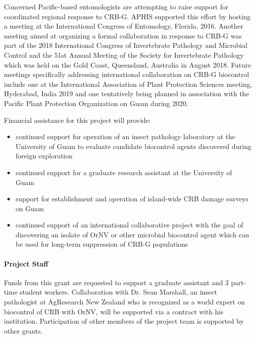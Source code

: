 \documentclass[14pt,english,letterpaper]{scrartcl}
\begin{document}
Concerned Pacific-based entomologists are attempting to raise support for coordinated regional
response to CRB-G. APHIS supported this effort by hosting a meeting at the International
Congress of Entomology, Florida, 2016. Another meeting aimed at organizing a formal
collaboration in response to CRB-G was part of the 2018 International Congress of
Invertebrate Pathology and Microbial Control and the 51st Annual Meeting of the Society for
Invertebrate Pathology which was held on the Gold Coast, Queensland, Australia in August 2018.
Future meetings specifically addressing international collaboration on CRB-G biocontrol include
one at the International Association of Plant Protection Sciences meeting, Hyderabad, India 2019 and
one tentatively being planned in association with the Pacific Plant Protection Organization on Guam during 2020.

\pagebreak

Financial assistance for this project will provide:
\begin{itemize}
	
	\item continued support for operation of an insect pathology laboratory at the University of
	Guam to evaluate candidate biocontrol agents discovered during foreign exploration
	
	\item continued support for a graduate research assistant at the University of Guam
	
	\item support for establishment and operation of island-wide CRB damage surveys on Guam
	
	\item continued support of an international collaborative project with the goal of discovering	an isolate of OrNV or other microbial biocontrol agent which can be used for long-term suppression of CRB-G populations

\end{itemize}

\paragraph{Project Staff}

Funds from this grant are requested to support a graduate assistant and 3 part-time student workers.
Collaboration with Dr. Sean Marshall, an insect pathologist at AgResearch New Zealand who is recognized as a world expert on biocontrol of CRB with OrNV, will be supported via a contract with his institution. Participation of other members of the project team is supported by other grants.
\end{document}
